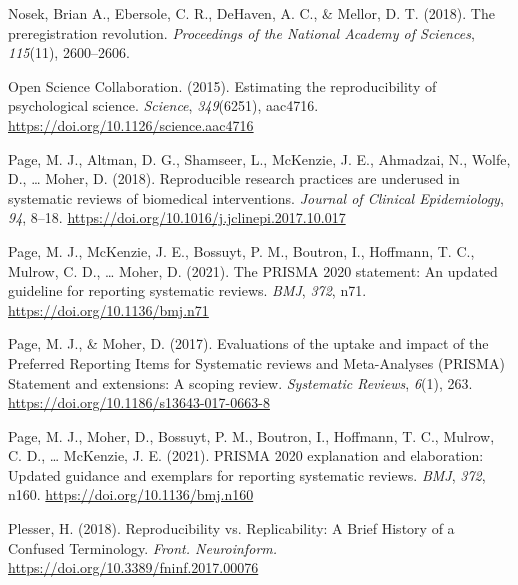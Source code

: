 \documentclass[
  man,floatsintext]{apa6}
\newlength{\cslhangindent}
\newlength{\cslentryspacingunit} %
\newenvironment{CSLReferences}[2] %
 {%
  \setlength{\parindent}{0pt}
  \ifodd #1
  \let\oldpar\par
  \def\par{\hangindent=\cslhangindent\oldpar}
  \fi
  \setlength{\parskip}{#2\cslentryspacingunit}
 }%
 {}
\begin{document}
\begin{CSLReferences}{1}{0}
\leavevmode{}%
Nosek, Brian A., Ebersole, C. R., DeHaven, A. C., \& Mellor, D. T. (2018). The preregistration revolution. \emph{Proceedings of the National Academy of Sciences}, \emph{115}(11), 2600--2606.

\leavevmode{}%
Open Science Collaboration. (2015). Estimating the reproducibility of psychological science. \emph{Science}, \emph{349}(6251), aac4716. \url{https://doi.org/10.1126/science.aac4716}

\leavevmode{}%
Page, M. J., Altman, D. G., Shamseer, L., McKenzie, J. E., Ahmadzai, N., Wolfe, D., \ldots{} Moher, D. (2018). Reproducible research practices are underused in systematic reviews of biomedical interventions. \emph{Journal of Clinical Epidemiology}, \emph{94}, 8--18. \url{https://doi.org/10.1016/j.jclinepi.2017.10.017}

\leavevmode{}%
Page, M. J., McKenzie, J. E., Bossuyt, P. M., Boutron, I., Hoffmann, T. C., Mulrow, C. D., \ldots{} Moher, D. (2021). The {PRISMA} 2020 statement: An updated guideline for reporting systematic reviews. \emph{BMJ}, \emph{372}, n71. \url{https://doi.org/10.1136/bmj.n71}

\leavevmode{}%
Page, M. J., \& Moher, D. (2017). Evaluations of the uptake and impact of the {Preferred Reporting Items} for {Systematic} reviews and {Meta-Analyses} ({PRISMA}) {Statement} and extensions: A scoping review. \emph{Systematic Reviews}, \emph{6}(1), 263. \url{https://doi.org/10.1186/s13643-017-0663-8}

\leavevmode{}%
Page, M. J., Moher, D., Bossuyt, P. M., Boutron, I., Hoffmann, T. C., Mulrow, C. D., \ldots{} McKenzie, J. E. (2021). {PRISMA} 2020 explanation and elaboration: Updated guidance and exemplars for reporting systematic reviews. \emph{BMJ}, \emph{372}, n160. \url{https://doi.org/10.1136/bmj.n160}

\leavevmode{}%
Plesser, H. (2018). Reproducibility vs. {Replicability}: {A Brief History} of a {Confused Terminology}. \emph{Front. Neuroinform.} \url{https://doi.org/10.3389/fninf.2017.00076}


\end{CSLReferences}
\end{document}
